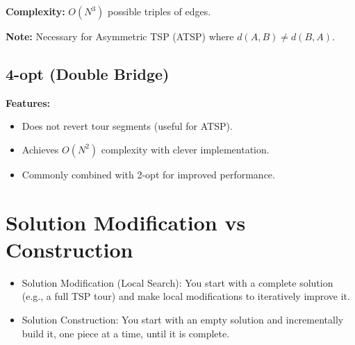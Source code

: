 \textbf{Complexity:} $O(N^3)$ possible triples of edges.  

\textbf{Note:} Necessary for Asymmetric TSP (ATSP) where $d(A,B) \neq d(B,A)$.

\subsection*{4-opt (Double Bridge)}
\textbf{Features:}
\begin{itemize}
    \item Does not revert tour segments (useful for ATSP).
    \item Achieves $O(N^2)$ complexity with clever implementation.
    \item Commonly combined with 2-opt for improved performance.
\end{itemize}

\section*{Solution Modification vs Construction}

\begin{itemize}
    \item Solution Modification (Local Search):
    You start with a complete solution (e.g., a full TSP tour) and make local 
    modifications  to iteratively improve it.
    \item Solution Construction:  You start with an empty solution and 
    incrementally build it, one piece at a time, until it is complete.
\end{itemize}

